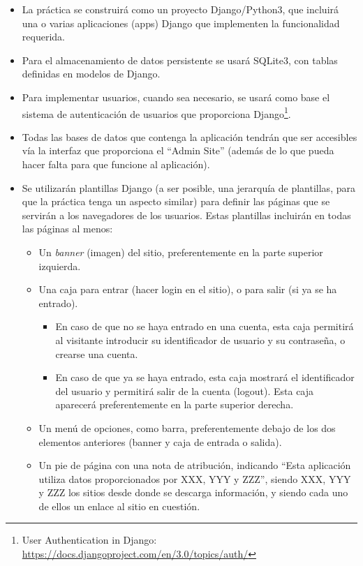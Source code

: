 \begin{itemize}

\item La práctica se construirá como un proyecto Django/Python3, que incluirá una o varias aplicaciones (apps) Django que implementen la funcionalidad requerida.

\item Para el almacenamiento de datos persistente se usará SQLite3, con tablas definidas en modelos de Django.

\item Para implementar usuarios, cuando sea necesario, se usará como base el sistema de autenticación de usuarios que proporciona Django\footnote{User Authentication in Django:\\ \url{https://docs.djangoproject.com/en/3.0/topics/auth/}}.

\item Todas las bases de datos que contenga la aplicación tendrán que ser accesibles vía la interfaz que proporciona el ``Admin Site'' (además de lo que pueda hacer falta para que funcione al aplicación).

\item Se utilizarán plantillas Django (a ser posible, una jerarquía de plantillas, para que la práctica tenga un aspecto similar) para definir las páginas que se servirán a los navegadores de los usuarios. Estas plantillas incluirán en todas las páginas al menos:

  \begin{itemize}
  \item Un \emph{banner} (imagen) del sitio, preferentemente en la parte superior izquierda.
  \item Una caja para entrar (hacer login en el sitio), o para salir (si ya se ha entrado).
    \begin{itemize}
    \item En caso de que no se haya entrado en una cuenta, esta caja permitirá al visitante introducir su identificador de usuario y su contraseña, o crearse una cuenta.
    \item En caso de que ya se haya entrado, esta caja mostrará el identificador del usuario y permitirá salir de la cuenta (logout). Esta caja aparecerá preferentemente en la parte superior derecha.
    \end{itemize}
  \item Un menú de opciones, como barra, preferentemente debajo de los dos elementos anteriores (banner y caja de entrada o salida).
  \item Un pie de página con una nota de atribución, indicando ``Esta aplicación utiliza datos proporcionados por XXX, YYY y ZZZ'', siendo XXX, YYY y ZZZ los sitios desde donde se descarga información, y siendo cada uno de ellos un enlace al sitio en cuestión.
  \end{itemize}


\end{itemize}
